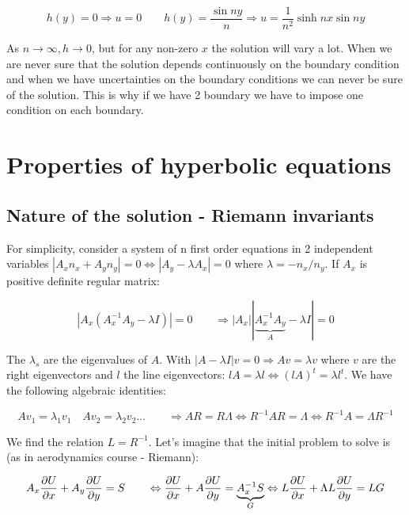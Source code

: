 \begin{equation}
h(y) = 0 \Rightarrow u=0 \qquad h(y) = \frac{\sin ny}{n} \Rightarrow u = \frac{1}{n^2}\sinh nx \sin ny
\end{equation}

As $n\rightarrow \infty, h \rightarrow 0$, but for any non-zero $x$ the solution will vary a lot. When we are never sure that the solution depends continuously on the boundary condition and when we have uncertainties on the boundary conditions we can never be sure of the solution. This is why if we have 2 boundary we have to impose one condition on each boundary. 

\section{Properties of hyperbolic equations}
\subsection{Nature of the solution - Riemann invariants}
For simplicity, consider a system of n first order equations in 2 independent variables $|A_x n_x + A_y n_y| = 0 \Leftrightarrow |A_y - \lambda A_x| = 0$ where $\lambda = -n_x/n_y$. If $A_x$ is positive definite regular matrix: 

\begin{equation}
|A_x (A_x^{-1}A_y - \lambda I)| = 0 \qquad \Rightarrow |A_x||\underbrace{A_x^{-1}A_y}_{A}-\lambda I| = 0
\end{equation}

The $\lambda _s$ are the eigenvalues of $A$. With $|A-\lambda I|v = 0 \Rightarrow Av = \lambda v$ where $v$ are the right eigenvectors and $l$ the line eigenvectors: $lA = \lambda l \Leftrightarrow (lA)^t = \lambda l^t$. We have the following algebraic identities: 

\begin{equation}
Av_1 = \lambda _1v_1 \quad Av_2 = \lambda _2v_2 \dots \qquad \Rightarrow A R = R \Lambda \Leftrightarrow R^{-1}AR = \Lambda \Leftrightarrow R^{-1} A = \Lambda R^{-1}
\end{equation}

We find the relation $L = R^{-1}$. Let's imagine that the initial problem to solve is (as in aerodynamics course - Riemann): 

\begin{equation}
A_x \frac{\partial U}{\partial x} + A_y \frac{\partial U}{\partial y} = S\qquad \Leftrightarrow  \frac{\partial U}{\partial x} + A \frac{\partial U}{\partial y} = \underbrace{A_x^{-1} S}_G \Leftrightarrow L\frac{\partial U}{\partial x} + \Lambda L \frac{\partial U}{\partial y} = LG
\end{equation}

